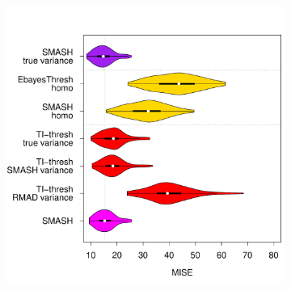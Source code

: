 \documentclass[12pt]{article}
\begin{document}
\begin{figure}
\centering
    \begin{subfigure}[b]{0.65\textwidth}
        \centering
        \includegraphics[width=\textwidth]{violin_gaus_hetero_1.pdf}
        \caption{}
        \label{fig:gaus_hetero_1}
    \end{subfigure}
		\hfill
    \begin{subfigure}[b]{0.3\textwidth}
        \centering

\end{subfigure}
\end{figure}
\end{document}
